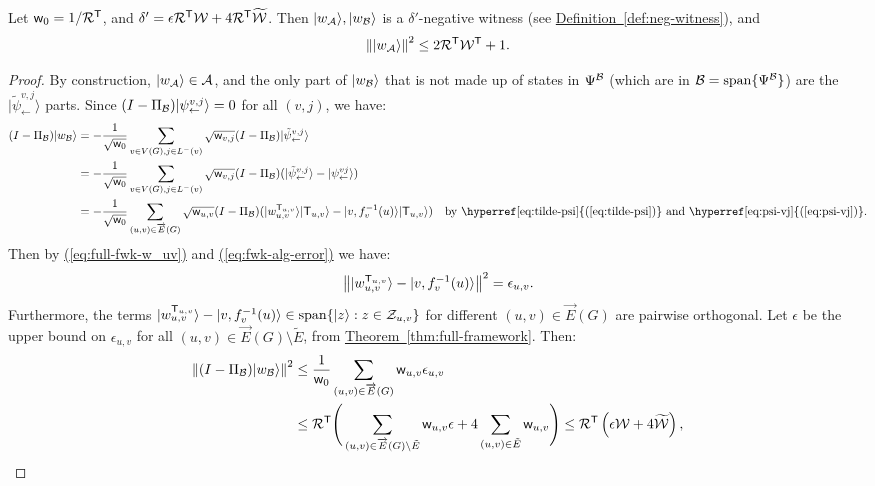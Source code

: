 \documentclass{theoretics}
\newcommand{\eq}[1]{\hyperref[eq:#1]{(\ref*{eq:#1})}}
\newcommand{\thm}[1]{\hyperref[thm:#1]{Theorem~\ref*{thm:#1}}}
\newcommand{\defin}[1]{\hyperref[def:#1]{Definition~\ref*{def:#1}}}
\def\ket#1{{\lvert}#1\rangle}
\renewcommand{\>}{\rangle}
\newcommand{\<}{\langle}
\renewcommand{\(}{\left(}
\renewcommand{\)}{\right)}
\def\norm#1{\left\| #1 \right\|}
\def\w{{\sf w}}
\begin{document}
\begin{lemma}\label{lem:full-fwk-negative-error}
Let $\w_0=1/{\cal R}^{\sf T}$, and $\delta'=\epsilon {\cal R}^{\sf T}{\cal W}+4{\cal R}^{\sf T}\widetilde{\cal W}$. Then $\ket{w_{\cal A}},\ket{w_{\cal B}}$ is a $\delta'$-negative witness (see \defin{neg-witness}), and 
$$\norm{\ket{w_{\cal A}}}^2\leq 2{\cal R}^{\sf T}{\cal W}^{\sf T}+1.$$
\end{lemma}
\begin{proof}
By construction, $\ket{w_{\cal A}}\in {\cal A}$, and the only part of $\ket{w_{\cal B}}$ that is not made up of states in $\Psi^{\cal B}$ (which are in ${\cal B}=\mathrm{span}\{\Psi^{\cal B}\}$) are the $\ket{\tilde\psi_{\leftarrow}^{v,j}}$ parts. Since $(I-\Pi_{\cal B})\ket{\psi_{\leftarrow}^{v,j}}=0$ for all $(v,j)$, we have:
\begin{align*}
(I-\Pi_{\cal B})\ket{w_{\cal B}} &= -\frac{1}{\sqrt{\w_0}}\sum_{v\in V(G),j\in L^-(v)}\sqrt{\w_{v,j}}(I-\Pi_{\cal B})\ket{\tilde\psi_{\leftarrow}^{v,j}}\\
&=-\frac{1}{\sqrt{\w_0}}\sum_{v\in V(G),j\in L^-(v)}\sqrt{\w_{v,j}}(I-\Pi_{\cal B})(\ket{\tilde\psi_{\leftarrow}^{v,j}}-\ket{\psi_{\leftarrow}^{vj}})\\
&=-\frac{1}{\sqrt{\w_0}}\sum_{(u,v)\in\overrightarrow{E}(G)}\sqrt{\w_{u,v}}(I-\Pi_{\cal B})(\ket{w_{u,v}^{{\sf T}_{u,v}}}\ket{{\sf T}_{u,v}} - \ket{v,f_v^{-1}(u)}\ket{{\sf T}_{u,v}}) & \mbox{by \eq{tilde-psi} and \eq{psi-vj}}.
\end{align*}
Then by \eq{full-fwk-w_uv} and \eq{fwk-alg-error} we have:
\begin{equation*}
\norm{\ket{w_{u,v}^{{\sf T}_{u,v}}} - \ket{v,f_v^{-1}(u)}}^2 = \epsilon_{u,v}.
\end{equation*}
Furthermore, the terms $\ket{w_{u,v}^{{\sf T}_{u,v}}} - \ket{v,f_v^{-1}(u)}\in\mathrm{span}\{\ket{z}:z\in {\cal Z}_{u,v}\}$ for different $(u,v)\in \overrightarrow{E}(G)$ are pairwise orthogonal. 
Let $\epsilon$ be the upper bound on $\epsilon _{u,v}$ for all $(u,v)\in\overrightarrow{E}(G)\setminus\tilde{E}$, from \thm{full-framework}. Then:
\begin{align*}
\norm{(I-\Pi_{\cal B})\ket{w_{\cal B}}}^2 &\leq\frac{1}{{\w_0}}\sum_{(u,v)\in\overrightarrow{E}(G)}{\w_{u,v}}\epsilon_{u,v}\\
&\leq {\cal R}^{\sf T}\Bigg(\sum_{(u,v)\in\overrightarrow{E}(G)\setminus \tilde{E}}{\w_{u,v}}\epsilon + 4\sum_{(u,v)\in\tilde{E}}\w_{u,v}\Bigg) \leq {\cal R}^{\sf T}\left(\epsilon {\cal W}+4\widetilde{\cal W}\right),
\end{align*}

\end{proof}
\end{document}
